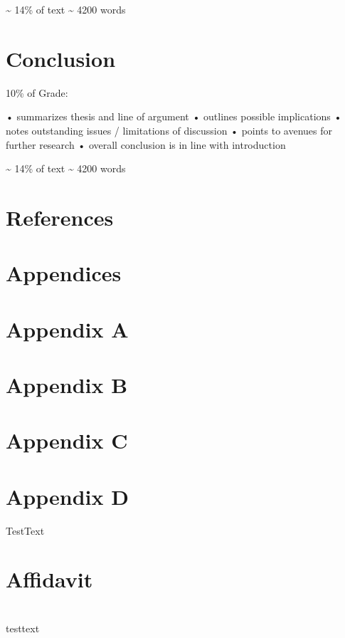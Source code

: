 \documentclass[12pt,a4paper]{book}      %
\begin{document}
\textasciitilde{} 14\% of text \textasciitilde{} 4200 words


\chapter{Conclusion}\label{conclusion}

10\% of Grade:

• summarizes thesis and line of argument • outlines possible
implications • notes outstanding issues / limitations of discussion •
points to avenues for further research • overall conclusion is in line
with introduction

\textasciitilde{} 14\% of text \textasciitilde{} 4200 words


\chapter*{References}\label{references}


\label{refs}

\cleardoublepage
{}
{}
\appendix

\chapter{Appendices}\label{appendices-1}

\chapter{Appendix A}\label{appendix-a}

\chapter{Appendix B}\label{appendix-b}

\chapter{Appendix C}\label{appendix-c}

\chapter{Appendix D}\label{appendix-d}

TestText

\chapter{Affidavit}\label{affidavit}

\chapter{}\label{section}

testtext
\end{document}
